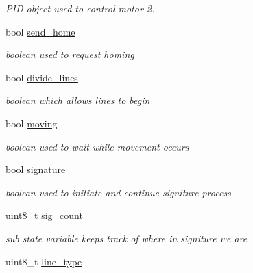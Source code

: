\begin{DoxyCompactItemize}
\begin{DoxyCompactList}\small\item\em P\-I\-D object used to control motor 2. \end{DoxyCompactList}\item 
\hypertarget{classtask__lines_a2cb987744a37b733479a1766a61a7734}{bool \hyperlink{classtask__lines_a2cb987744a37b733479a1766a61a7734}{send\-\_\-home}}\label{classtask__lines_a2cb987744a37b733479a1766a61a7734}

\begin{DoxyCompactList}\small\item\em boolean used to request homing \end{DoxyCompactList}\item 
\hypertarget{classtask__lines_a741d9e704cb8842d8b5f18b88c386cb9}{bool \hyperlink{classtask__lines_a741d9e704cb8842d8b5f18b88c386cb9}{divide\-\_\-lines}}\label{classtask__lines_a741d9e704cb8842d8b5f18b88c386cb9}

\begin{DoxyCompactList}\small\item\em boolean which allows lines to begin \end{DoxyCompactList}\item 
\hypertarget{classtask__lines_a7abff223287d4d2e921b71c39bd179ba}{bool \hyperlink{classtask__lines_a7abff223287d4d2e921b71c39bd179ba}{moving}}\label{classtask__lines_a7abff223287d4d2e921b71c39bd179ba}

\begin{DoxyCompactList}\small\item\em boolean used to wait while movement occurs \end{DoxyCompactList}\item 
\hypertarget{classtask__lines_aea9f2c1abc6285bb1131b2098dd2a567}{bool \hyperlink{classtask__lines_aea9f2c1abc6285bb1131b2098dd2a567}{signature}}\label{classtask__lines_aea9f2c1abc6285bb1131b2098dd2a567}

\begin{DoxyCompactList}\small\item\em boolean used to initiate and continue signiture process \end{DoxyCompactList}\item 
\hypertarget{classtask__lines_a67c3830a872bf2d6d2215eec15156e51}{uint8\-\_\-t \hyperlink{classtask__lines_a67c3830a872bf2d6d2215eec15156e51}{sig\-\_\-count}}\label{classtask__lines_a67c3830a872bf2d6d2215eec15156e51}

\begin{DoxyCompactList}\small\item\em sub state variable keeps track of where in signiture we are \end{DoxyCompactList}\item 
\hypertarget{classtask__lines_ae33211839ee44fdf75ba2aef43c8a566}{uint8\-\_\-t \hyperlink{classtask__lines_ae33211839ee44fdf75ba2aef43c8a566}{line\-\_\-type}}\label{classtask__lines_ae33211839ee44fdf75ba2aef43c8a566}


\end{DoxyCompactItemize}
